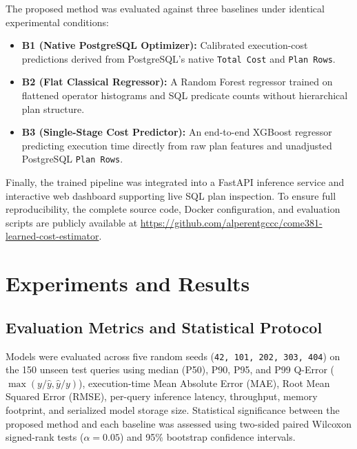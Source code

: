 \documentclass[conference]{IEEEtran}
\begin{document}
The proposed method was evaluated against three baselines under identical experimental conditions:
\begin{itemize}
    \item \textbf{B1 (Native PostgreSQL Optimizer):} Calibrated execution-cost predictions derived from PostgreSQL's native \texttt{Total Cost} and \texttt{Plan Rows}.
    \item \textbf{B2 (Flat Classical Regressor):} A Random Forest regressor trained on flattened operator histograms and SQL predicate counts without hierarchical plan structure.
    \item \textbf{B3 (Single-Stage Cost Predictor):} An end-to-end XGBoost regressor predicting execution time directly from raw plan features and unadjusted PostgreSQL \texttt{Plan Rows}.
\end{itemize}

Finally, the trained pipeline was integrated into a FastAPI inference service and interactive web dashboard supporting live SQL plan inspection. To ensure full reproducibility, the complete source code, Docker configuration, and evaluation scripts are publicly available at \url{https://github.com/alperentgccc/come381-learned-cost-estimator}.

\section{Experiments and Results}
\subsection{Evaluation Metrics and Statistical Protocol}
Models were evaluated across five random seeds (\texttt{42, 101, 202, 303, 404}) on the 150 unseen test queries using median (P50), P90, P95, and P99 Q-Error ($\max(y/\hat{y}, \hat{y}/y)$), execution-time Mean Absolute Error (MAE), Root Mean Squared Error (RMSE), per-query inference latency, throughput, memory footprint, and serialized model storage size. Statistical significance between the proposed method and each baseline was assessed using two-sided paired Wilcoxon signed-rank tests ($\alpha = 0.05$) and 95\% bootstrap confidence intervals.
\end{document}
